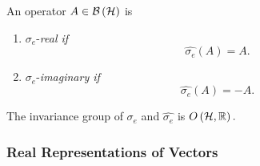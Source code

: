 \begin{definition}
An operator $A\in {\cal B}\left( {\cal H}\right) $ is

\begin{enumerate}
\item $\sigma _{e}$-{\em real if }%
\begin{equation}
\widehat{\sigma _{e}}\left( A\right) =A.
\end{equation}

\item $\sigma _{e}$-{\em imaginary if }%
\begin{equation}
\widehat{\sigma _{e}}\left( A\right) =-A.
\end{equation}
\end{enumerate}
\end{definition}

\begin{lemma}
The invariance group of $\sigma _{e}$ and $\widehat{\sigma _{e}}$ is $%
O\left( {\cal H},{\Bbb R}\right) .$
\end{lemma}

\subsubsection{Real Representations of Vectors}

